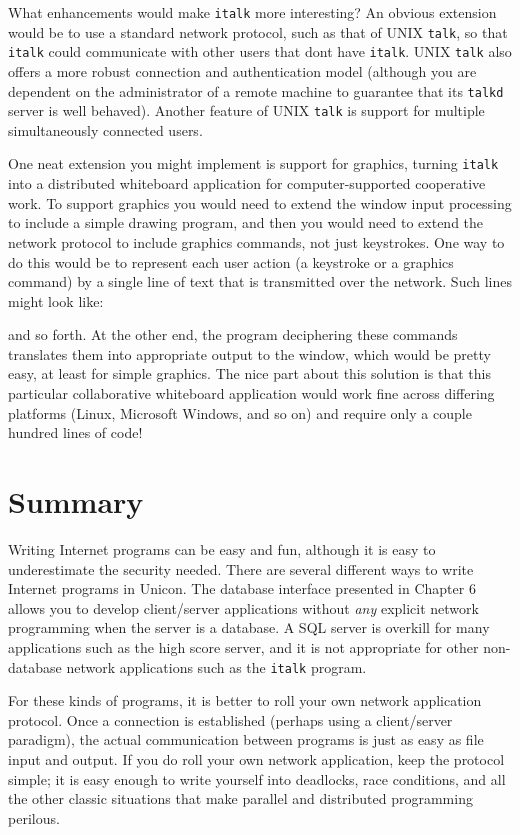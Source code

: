 What enhancements would make \texttt{italk} more interesting? An
obvious extension would be to use a standard network protocol,
such as that of UNIX \texttt{talk}, so that \texttt{italk} could
communicate with other users that don{\textquotesingle}t have
\texttt{italk}. UNIX \texttt{talk} also offers a more robust connection
and authentication model (although you are dependent on the
administrator of a remote machine to guarantee that its \texttt{talkd}
server is well behaved). Another feature of UNIX \texttt{talk} is
support for multiple simultaneously connected users.

One neat extension you might implement is support for
graphics, turning \texttt{italk} into a distributed whiteboard
application for computer-supported cooperative work. To support
graphics you would need to extend the window input processing to
include a simple drawing program, and then you would need to extend the
network protocol to include graphics commands, not just keystrokes. One
way to do this would be to represent each user action (a keystroke or a
graphics command) by a single line of text that is transmitted over the
network. Such lines might look like:


\noindent
and so forth. At the other end, the program deciphering these commands
translates them into appropriate output to the window, which would be
pretty easy, at least for simple graphics. The nice part about this
solution is that this particular collaborative whiteboard application
would work fine across differing platforms (Linux, Microsoft Windows,
and so on) and require only a couple hundred lines of code!

\section*{Summary}

Writing Internet programs can be easy and fun, although it is easy to
underestimate the security needed. There are several
different ways to write Internet programs in Unicon. The
database interface presented in Chapter 6 allows you to
develop client/server applications without \textit{any} explicit
network programming when the server is a database. A SQL
server is overkill for many applications such as the high score server,
and it is not appropriate for other non-database network applications
such as the \texttt{italk} program.

For these kinds of programs, it is better to {\textquotedbl}roll your
own{\textquotedbl} network application protocol. Once a connection is
established (perhaps using a client/server paradigm), the actual
communication between programs is just as easy as file input and
output. If you do roll your own network application, keep the protocol
simple; it is easy enough to write yourself into deadlocks, race
conditions, and all the other classic situations that make parallel and
distributed programming perilous.

